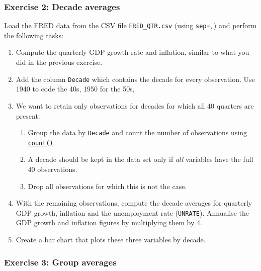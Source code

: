 \documentclass{scrartcl}
\providecommand{\tightlist}{%
      \setlength{\itemsep}{0pt}\setlength{\parskip}{0pt}}
\begin{document}
    \hypertarget{exercise-2-decade-averages}{%
\subsubsection{Exercise 2: Decade
averages}\label{exercise-2-decade-averages}}

Load the FRED data from the CSV file \texttt{FRED\_QTR.csv} (using
\texttt{sep=\textquotesingle{},\textquotesingle{}}) and perform the
following tasks:

\begin{enumerate}
\def\labelenumi{\arabic{enumi}.}
\tightlist
\item
  Compute the quarterly GDP growth rate and inflation, similar to what
  you did in the previous exercise.
\item
  Add the column \texttt{Decade} which contains the decade for every
  observation. Use 1940 to code the 40s, 1950 for the 50s, \etc
\item
  We want to retain only observations for decades for which all 40
  quarters are present:

  \begin{enumerate}
  \def\labelenumii{\arabic{enumii}.}
  \tightlist
  \item
    Group the data by \texttt{Decade} and count the number of
    observations using
    \href{https://pandas.pydata.org/pandas-docs/stable/reference/api/pandas.DataFrame.count.html}{\texttt{count()}}.
  \item
    A decade should be kept in the data set only if \emph{all} variables
    have the full 40 observations.
  \item
    Drop all observations for which this is not the case.
  \end{enumerate}
\item
  With the remaining observations, compute the decade averages for
  quarterly GDP growth, inflation and the unemployment rate
  (\texttt{UNRATE}). Annualise the GDP growth and inflation figures by
  multiplying them by 4.
\item
  Create a bar chart that plots these three variables by decade.
\end{enumerate}

    \hypertarget{exercise-3-group-averages}{%
\subsubsection{Exercise 3: Group
averages}\label{exercise-3-group-averages}}
\end{document}
